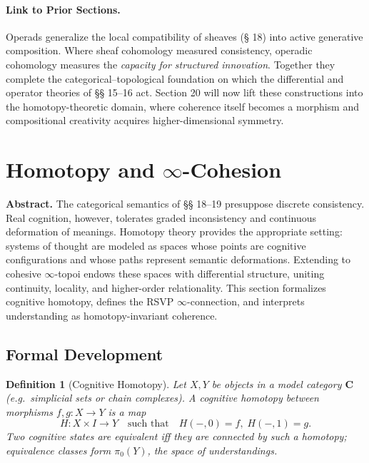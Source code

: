 \documentclass[12pt,a4paper,twoside,openright]{book}
\newtheorem{definition}[theorem]{Definition}
\begin{document}
\paragraph{Link to Prior Sections.}
Operads generalize the local compatibility of sheaves (§ 18) into active generative composition.  
Where sheaf cohomology measured consistency, operadic cohomology measures the \emph{capacity for structured innovation}.  
Together they complete the categorical–topological foundation on which the differential and operator theories of §§ 15–16 act.  
Section 20 will now lift these constructions into the homotopy-theoretic domain, where coherence itself becomes a morphism and compositional creativity acquires higher-dimensional symmetry.


\section{Homotopy and \texorpdfstring{$\infty$}{∞}-Cohesion}
\label{sec:homotopy}

\textbf{Abstract.}
The categorical semantics of §§ 18–19 presuppose discrete consistency.  
Real cognition, however, tolerates graded inconsistency and continuous deformation of meanings.  
Homotopy theory provides the appropriate setting: systems of thought are modeled as spaces whose points are cognitive configurations and whose paths represent semantic deformations.  
Extending to cohesive $\infty$-topoi endows these spaces with differential structure, uniting continuity, locality, and higher-order relationality.  
This section formalizes cognitive homotopy, defines the RSVP $\infty$-connection, and interprets understanding as homotopy-invariant coherence.

\subsection*{Formal Development}

\begin{definition}[Cognitive Homotopy]
Let $X,Y$ be objects in a model category $\mathbf{C}$ (e.g.\ simplicial sets or chain complexes).  
A \emph{cognitive homotopy} between morphisms $f,g\colon X\to Y$ is a map
\[
H\colon X\times I \longrightarrow Y
\quad\text{such that}\quad
H(-,0)=f,\; H(-,1)=g.
\]
Two cognitive states are equivalent iff they are connected by such a homotopy; equivalence classes form $\pi_0(Y)$, the \emph{space of understandings}.
\end{definition}
\end{document}

